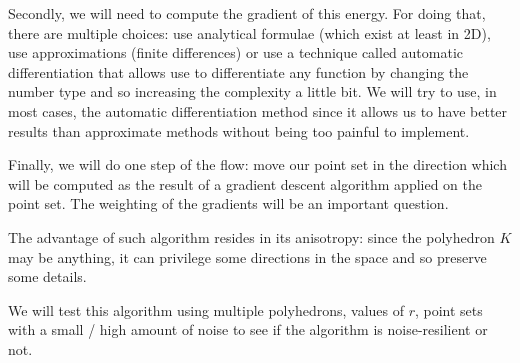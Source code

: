 Secondly, we will need to compute the gradient of this energy. For doing that,
there are multiple choices: use analytical formulae (which exist at least in
2D), use approximations (finite differences) or use a technique called automatic
differentiation that allows use to differentiate any function by changing the
number type and so increasing the complexity a little bit. We will try to use,
in most cases, the automatic differentiation method since it allows us to have
better results than approximate methods without being too painful to implement.

Finally, we will do one step of the flow: move our point set in the direction
which will be computed as the result of a gradient descent algorithm applied on
the point set. The weighting of the gradients will be an important question.

The advantage of such algorithm resides in its anisotropy: since the polyhedron
$ K $ may be anything, it can privilege some directions in the space and so
preserve some details.

We will test this algorithm using multiple polyhedrons, values of $ r
$, point sets with a small / high amount of noise to see if the algorithm is
noise-resilient or not.

